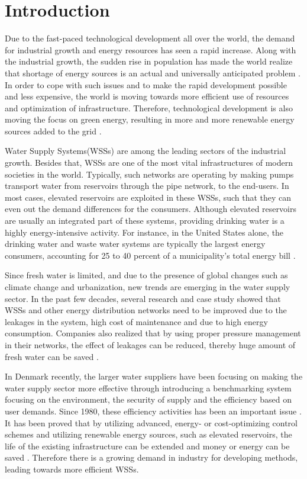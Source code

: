 \chapter{Introduction}
\label{introduction}

Due to the fast-paced technological development all over the world, the demand for industrial growth and energy resources has seen a rapid increase. Along with the industrial growth, the sudden rise in population has made the world realize that shortage of energy sources is an actual and universally anticipated problem \cite{sustainable_water}. In order to cope with such issues and to make the rapid development possible and less expensive, the world is moving towards more efficient use of resources and optimization of infrastructure. Therefore, technological development is also moving the focus on green energy, resulting in more and more renewable energy sources added to the grid \cite{fluctuating_price}. 

Water Supply Systems(WSSs) are among the leading sectors of the industrial growth. Besides that, WSSs are one of the most vital infrastructures of modern societies in the world. Typically, such networks are operating by making pumps transport water from reservoirs through the pipe network, to the end-users. In most cases, elevated reservoirs are exploited in these WSSs, such that they can even out the demand differences for the consumers. Although elevated reservoirs are usually an integrated part of these systems, providing drinking water is a highly energy-intensive activity. For instance, in the United States alone, the drinking water and waste water systems are typically the largest energy consumers, accounting for 25 to 40 percent of a municipality's total energy bill \cite{appelbaum2002water}. 

Since fresh water is limited, and due to the presence of global changes such as climate change and urbanization, new trends are emerging in the water supply sector. In the past few decades, several research and case study showed that WSSs and other energy distribution networks need to be improved due to the leakages in the system, high cost of maintenance and due to high energy consumption. Companies also realized that by using proper pressure management in their networks, the effect of leakages can be reduced, thereby huge amount of fresh water can be saved \cite{national2005public}. 

In Denmark recently, the larger water suppliers have been focusing on making the water supply sector more effective through introducing a benchmarking system focusing on the environment, the security of supply and the efficiency based on user demands. Since 1980, these efficiency activities has been an important issue \cite{water_denmark}. It has been proved that by utilizing advanced, energy- or cost-optimizing control schemes and utilizing renewable energy sources, such as elevated reservoirs, the life of the existing infrastructure can be extended and money or energy can be saved \cite{sustainable_water}. Therefore there is a growing demand in industry for developing methods, leading towards more efficient WSSs. 

